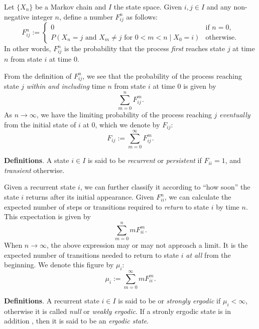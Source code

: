 \documentclass[12pt]{article}
\begin{document}
Let $\lbrace X_n\rbrace$ be a  Markov chain and $I$ the state space. Given $i,j\in I$ and any non-negative integer $n$, define a number $F_{ij}^n$ as follows:
$$
F_{ij}^n:=
\begin{cases}
0&\text{if } n=0,\\
P(X_n=j\mbox{ and }X_m\ne j\mbox{ for }0<m<n \mid X_0=i)&\text{otherwise}.
\end{cases}
$$
In other words, $F_{ij}^n$ is the probability that the process \emph{first} reaches state $j$ at time $n$ from state $i$ at time $0$.

From the definition of $F_{ij}^n$, we see that the probability of the process reaching state $j$ \emph{within and including} time $n$ from state $i$ at time $0$ is given by 
$$\sum_{m=0}^n F_{ij}^m.$$
As $n\to \infty$, we have the limiting probability of the process reaching $j$ \emph{eventually} from the initial state of $i$ at $0$, which we denote by $F_{ij}$:
$$F_{ij}:=\sum_{m=0}^{\infty} F_{ij}^m.$$

\textbf{Definitions}.  A state $i\in I$ is said to be \emph{recurrent} or \emph{persistent} if $F_{ii}=1$, and \emph{transient} otherwise.

Given a recurrent state $i$, we can further classify it according to ``how soon'' the state $i$ returns after its initial appearance.  Given $F_{ii}^n$, we can calculate the expected number of steps or transitions required to \emph{return} to state $i$ by time $n$.  This expectation is given by
$$\sum_{m=0}^n m F_{ii}^m.$$
When $n\to \infty$, the above expression may or may not approach a limit.  It is the expected number of transitions needed to return to state $i$ \emph{at all} from the beginning.  We denote this figure by $\mu_i$:
$$\mu_{i}:=\sum_{m=0}^{\infty} m F_{ii}^m.$$

\textbf{Definitions}.  A recurrent state $i\in I$ is said to be \emph{} or \emph{strongly ergodic} if $\mu_i<\infty$, otherwise it is called \emph{null} or \emph{weakly ergodic}.  If a stronly ergodic state is in addition , then it is said to be an \emph{ergodic state}.
\end{document}
